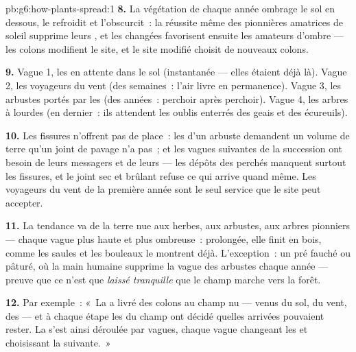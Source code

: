 \begin{solution}{pb:g6:how-plants-spread:1}
\textbf{8.} La végétation de chaque année ombrage le sol en dessous,
le refroidit et l'obscurcit~: la réussite même des pionnières
amatrices de soleil supprime leurs , et les 
changées favorisent ensuite les amateurs d'ombre --- les colons
modifient le site, et le site modifié choisit de nouveaux colons.

\textbf{9.} Vague 1, les  en attente dans le sol
(instantanée --- elles étaient déjà là). Vague 2, les voyageurs du
vent (des semaines~: l'air livre en permanence). Vague 3, les
arbustes portés par les  (des années~: perchoir après
perchoir). Vague 4, les arbres à  lourdes (en dernier~: ils
attendent les oublis enterrés des geais et des écureuils).

\textbf{10.} Les fissures n'offrent pas de place~: les  d'un
arbuste demandent un volume de terre qu'un joint de pavage n'a pas~;
et les vagues suivantes de la succession ont besoin de leurs
messagers et de leurs  --- les dépôts des  perchés
manquent surtout les fissures, et le joint sec et brûlant refuse ce
qui arrive quand même. Les voyageurs du vent de la première année
sont le seul service que le site peut accepter.

\textbf{11.} La tendance va de la terre nue aux herbes, aux
arbustes, aux arbres pionniers --- chaque vague plus haute et plus
ombreuse~: prolongée, elle finit en bois, comme les saules et les
bouleaux le montrent déjà. L'exception~: un pré fauché ou pâturé, où
la main humaine supprime la vague des arbustes chaque année ---
preuve que ce n'est que \emph{laissé tranquille} que le champ marche
vers la forêt.

\textbf{12.} Par exemple~: «~La  a livré des colons au
champ nu --- venus du sol, du vent, des  --- et à chaque
étape les  du champ ont décidé quelles arrivées pouvaient
rester. La  s'est ainsi déroulée par vagues, chaque
vague changeant les  et choisissant la suivante.~»
\end{solution}
